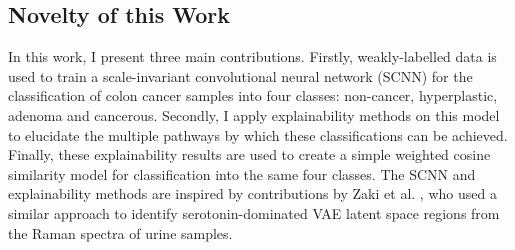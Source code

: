 
\subsection{Novelty of this Work}
In this work, I present three main contributions. Firstly, weakly-labelled data is used to train a scale-invariant convolutional neural network (SCNN) for the classification of colon cancer samples into four classes: non-cancer, hyperplastic, adenoma and cancerous. Secondly, I apply explainability methods on this model to elucidate the multiple pathways by which these classifications can be achieved. Finally, these explainability results are used to create a simple weighted cosine similarity model for classification into the same four classes. The SCNN and explainability methods are inspired by contributions by Zaki et al. \cite{zaki_explainable_2024}, who used a similar approach to identify  serotonin-dominated VAE latent space regions from the Raman spectra of urine samples.

